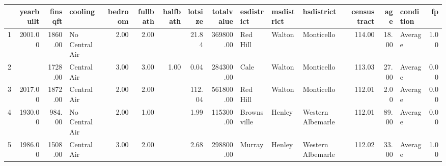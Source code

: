 \begin{table}[ht]
\centering
\begin{tabular}{rrrlrrrrrlllrrlr}
  \hline
 & yearbuilt & finsqft & cooling & bedroom & fullbath & halfbath & lotsize & totalvalue & esdistrict & msdistrict & hsdistrict & censustract & age & condition & fp \\ 
  \hline
1 & 2001.00 & 1860.00 & No Central Air & 2.00 & 2.00 &  & 21.84 & 369800.00 & Red Hill & Walton & Monticello & 114.00 & 18.00 & Average & 1.00 \\ 
  2 &  & 1728.00 & Central Air & 3.00 & 3.00 & 1.00 & 0.04 & 284300.00 & Cale & Walton & Monticello & 113.03 & 27.00 & Average & 0.00 \\ 
  3 & 2017.00 & 1872.00 & Central Air & 2.00 & 2.00 &  & 112.04 & 561800.00 & Red Hill & Walton & Monticello & 112.01 & 2.00 & Average & 0.00 \\ 
  4 & 1930.00 & 984.00 & No Central Air & 2.00 & 1.00 &  & 1.99 & 115300.00 & Brownsville & Henley & Western Albemarle & 112.01 & 89.00 & Average & 0.00 \\ 
  5 & 1986.00 & 1508.00 & Central Air & 3.00 & 2.00 &  & 2.68 & 298800.00 & Murray & Henley & Western Albemarle & 112.02 & 33.00 & Average & 1.00 \\ 
   \hline
\end{tabular}
\end{table}
